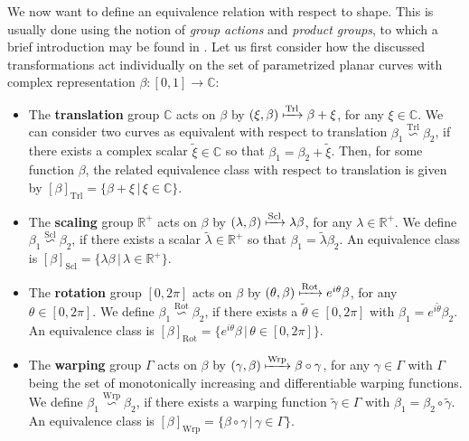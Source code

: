 We now want to define an equivalence relation with respect to shape.
This is usually done using the notion of \textit{group actions} and \textit{product groups}, to which a brief introduction may be found in \cite[Chap.\ 3]{SrivastavaKlassen2016}.
Let us first consider how the discussed transformations act
individually on the set of parametrized planar curves with complex
representation $\beta : [0,1]
\rightarrow \mathbb{C}$:
\begin{itemize}
  \item
    The \textbf{translation} group $\mathbb{C}$ acts on $\beta$ by $(\xi, \beta) \xmapsto{\text{Trl}} \beta + \xi$, for any $\xi \in \mathbb{C}$.
    We can consider two curves as equivalent with respect to translation $\beta_1 \overset{\text{Trl}}{\backsim} \beta_2$, if there exists a complex scalar $\tilde\xi \in \mathbb{C}$ so that $\beta_1 = \beta_2  + \tilde\xi$.
    Then, for some function $\beta$, the related equivalence class with respect to translation is given by $[\beta]_{\text{Trl}} = \{\beta + \xi\, |\, \xi \in \mathbb{C}\}$.
  \item 
    The \textbf{scaling} group $\mathbb{R}^+$ acts on $\beta$ by $(\lambda, \beta) \xmapsto{\text{Scl}} \lambda \beta$, for any $\lambda \in \mathbb{R}^+$.
    We define $\beta_1 \overset{\text{Scl}}{\backsim} \beta_2$, if there exists a scalar $\tilde\lambda \in \mathbb{R}^+$ so that $\beta_1 = \tilde\lambda \beta_2$.
    An equivalence class is $[\beta]_{\text{Scl}} = \{\lambda\beta\,|\, \lambda \in \mathbb{R}^+\}$.
  \item 
    The \textbf{rotation} group $[0,2\pi]$ acts on $\beta$ by $(\theta, \beta) \xmapsto{\text{Rot}}  e^{i\theta} \beta$, for any $\theta \in [0,2\pi]$.
    We define $\beta_1 \overset{\text{Rot}}{\backsim} \beta_2$, if there exists a $\tilde\theta \in [0,2\pi]$ with $\beta_1 = e^{i\tilde\theta} \beta_2$.
    An equivalence class is $[\beta]_{\text{Rot}} = \{e^{i\theta}\beta\,|\, \theta \in [0,2\pi]\}$.
  \item 
    The \textbf{warping} group $\Gamma$ acts on $\beta$ by $(\gamma,\beta) \xmapsto{\text{Wrp}} \beta \circ \gamma$, for any $\gamma \in \Gamma$ with $\Gamma$ being the set of monotonically increasing and differentiable warping functions.
    We define $\beta_1 \overset{\text{Wrp}}{\backsim} \beta_2$, if there exists a warping function $\tilde\gamma \in \Gamma$ with $\beta_1 = \beta_2 \circ \tilde\gamma$.
    An equivalence class is $[\beta]_{\text{Wrp}} = \{\beta \circ \gamma\,|\, \gamma \in \Gamma\}$.
\end{itemize}
